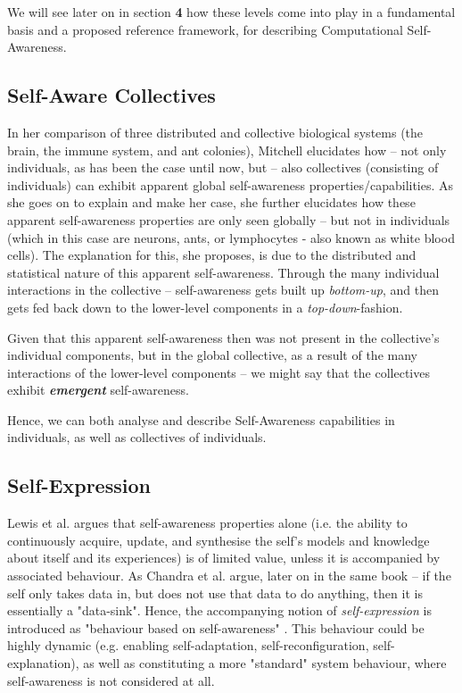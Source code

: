 	We will see later on in section \textbf{4} how these levels come into play in a fundamental basis and a proposed reference framework, for describing Computational Self-Awareness.


	\subsection{Self-Aware Collectives}

	In her comparison of three distributed and collective biological systems (the brain, the immune system, and ant colonies), Mitchell \cite{mitchell} elucidates how -- not only individuals, as has been the case until now, but -- also collectives (consisting of individuals) can exhibit apparent global self-awareness properties/capabilities. As she goes on to explain and make her case, she further elucidates how these apparent self-awareness properties are only seen globally -- but not in individuals (which in this case are neurons, ants, or lymphocytes - also known as white blood cells). The explanation for this, she proposes, is due to the distributed and statistical nature of this apparent self-awareness. Through the many individual interactions in the collective -- self-awareness gets built up \textit{bottom-up}, and then gets fed back down to the lower-level components in a \textit{top-down}-fashion.

	Given that this apparent self-awareness then was not present in the collective's individual components, but in the global collective, as a result of the many interactions of the lower-level components -- we might say that the collectives exhibit \textbf{\textit{emergent}} self-awareness.

	Hence, we can both analyse and describe Self-Awareness capabilities in individuals, as well as collectives of individuals.


	\subsection{Self-Expression}
	Lewis et al. \cite{sacs16_ch2} argues that self-awareness properties alone (i.e. the ability to continuously acquire, update, and synthesise the self's models and knowledge about itself and its experiences) is of limited value, unless it is accompanied by associated behaviour. As Chandra et al. \cite{sacs16_ch4} argue, later on in the same book -- if the self only takes data in, but does not use that data to do anything, then it is essentially a "data-sink". Hence, the accompanying notion of \textit{self-expression} is introduced as "behaviour based on self-awareness" \cite{sacs16_ch2}. This behaviour could be highly dynamic (e.g. enabling self-adaptation, self-reconfiguration, self-explanation), as well as constituting a more "standard" system behaviour, where self-awareness is not considered at all.

